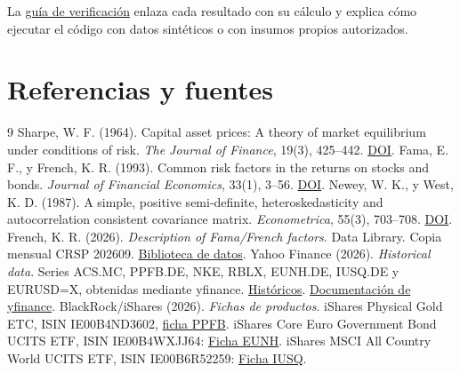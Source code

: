 \documentclass[11pt,a4paper]{article}
\begin{document}
La \href{https://github.com/jaimeeblancoo/beyond-beta/blob/main/docs/reviewer_guide.md}{guía de verificación} enlaza cada resultado con su cálculo y explica cómo ejecutar el código con datos sintéticos o con insumos propios autorizados.

\section{Referencias y fuentes}
\begingroup\small\setlength{\parskip}{4pt}
\begingroup\renewcommand{\section}[2]{}\begin{thebibliography}{9}
 Sharpe, W. F. (1964). Capital asset prices: A theory of market equilibrium under conditions of risk. \textit{The Journal of Finance}, 19(3), 425--442. \href{https://doi.org/10.1111/j.1540-6261.1964.tb02865.x}{DOI}.
 Fama, E. F., y French, K. R. (1993). Common risk factors in the returns on stocks and bonds. \textit{Journal of Financial Economics}, 33(1), 3--56. \href{https://doi.org/10.1016/0304-405X(93)90023-5}{DOI}.
 Newey, W. K., y West, K. D. (1987). A simple, positive semi-definite, heteroskedasticity and autocorrelation consistent covariance matrix. \textit{Econometrica}, 55(3), 703--708. \href{https://doi.org/10.2307/1913610}{DOI}.
 French, K. R. (2026). \textit{Description of Fama/French factors}. Data Library. Copia mensual CRSP 202609. \href{https://mba.tuck.dartmouth.edu/pages/faculty/ken.french/data_library/f-f_factors.html}{Biblioteca de datos}.
 Yahoo Finance (2026). \textit{Historical data}. Series ACS.MC, PPFB.DE, NKE, RBLX, EUNH.DE, IUSQ.DE y EURUSD=X, obtenidas mediante yfinance. \href{https://finance.yahoo.com/}{Históricos}. \href{https://ranaroussi.github.io/yfinance/reference/api/yfinance.download.html}{Documentación de yfinance}.
 BlackRock/iShares (2026). \textit{Fichas de productos}. iShares Physical Gold ETC, ISIN IE00B4ND3602, \href{https://www.ishares.com/gls-download/literature/fact-sheet/sgln-ishares-physical-gold-etc-fund-fact-sheet-en-de.pdf}{ficha PPFB}. iShares Core Euro Government Bond UCITS ETF, ISIN IE00B4WXJJ64: \href{https://www.ishares.com/gls-download/literature/fact-sheet/iega-ishares-core-govt-bond-ucits-etf-fund-fact-sheet-en-de.pdf}{Ficha EUNH}. iShares MSCI All Country World UCITS ETF, ISIN IE00B6R52259: \href{https://www.ishares.com/uk/individual/en/products/251850/ishares-msci-acwi-ucits-etf}{Ficha IUSQ}.
\end{thebibliography}\endgroup
\endgroup
\clearpage
\appendix
\end{document}
